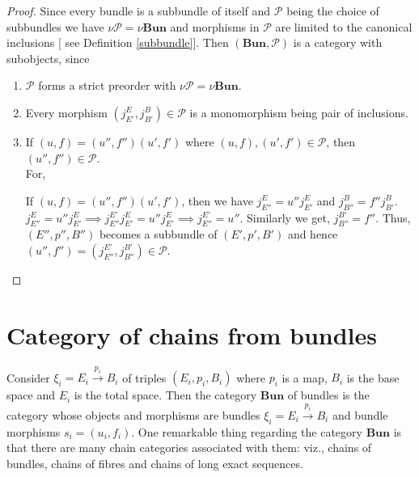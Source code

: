 \documentclass{amsart}
\theoremstyle{plain}
\begin{document}
\begin{proof} Since every bundle is a subbundle of itself and $\mathcal {P}$ being the choice of subbundles we have $\nu \mathcal {P} = \nu \textbf{Bun}$ and morphisms in $\mathcal {P}$  are limited to the canonical inclusions [ see Definition \ref{subbundle}].
	 Then $(\textbf{Bun},\mathcal {P} )$ is a category with subobjects, since 
	\begin{enumerate}
		\item $\mathcal {P}$ forms a strict preorder with $\nu \mathcal {P} = \nu \textbf{Bun}$.
		\item Every morphism  $(j_{E'}^{E}, j_{B'}^{B}) \in \mathcal {P}$ is a monomorphism being pair of inclusions.
		\item If $ (u, f) = (u'', f'')(u', f') $ where $ (u, f), (u', f') \in  \mathcal {P}$, then $(u'', f'') \in  \mathcal {P}$.\\
		    For, 
		    \begin{center}
		    \end{center}
	    \begin{center}
	    \end{center}
    If $ (u, f) = (u'', f'')(u', f') $, then we have $j_{E''}^{E} = u''j_{E'}^{E}$ and $j_{B''}^{B} = f'' j_{B'}^{B}$.\\
    $j_{E''}^{E} = u''j_{E'}^{E} \implies j_{E''}^{E'}j_{E'}^{E} = u''j_{E'}^{E} \implies j_{E''}^{E'} = u''$. Similarly we get, $ j_{B''}^{B'} = f''$. Thus, $(E'',p'',B'')$ becomes a  subbundle of $(E', p', B')$ and hence $(u'', f'') = (j_{E''}^{E'},j_{B''}^{B'} ) \in \mathcal {P}$.
	\end{enumerate}
\end{proof}
\section{Category of chains from bundles}
Consider $\xi_i = E_i \stackrel{p_i}{\rightarrow}  B_i$ of triples $(E_i, p_i, B_i)$ where $p_i$ is a map, $B_i$ is the base space and $E_i$ is the total space. Then the category $\textbf{Bun} $ of bundles is the category whose objects and morphisms are bundles $\xi_i = E_i \stackrel{p_i}{\rightarrow}  B_i$ and bundle morphisms $s_i = (u_i, f_i)$. One remarkable thing regarding the category $\textbf{Bun} $ is that there are many chain  categories associated with them: viz., chains of bundles, chains of fibres and chains of long exact sequences. 
\end{document}
